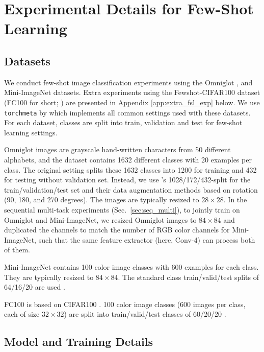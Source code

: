 \documentclass[nohyperref]{article}
\theoremstyle{plain}
\theoremstyle{definition}
\theoremstyle{remark}
\begin{document}
\section{Experimental Details for Few-Shot Learning}
\label{app:fs_exp}

\subsection{Datasets}
We conduct few-shot image classification experiments using the Omniglot \citep{lake2015human},
and Mini-ImageNet \citep{VinyalsBLKW16, RaviL17} datasets.
Extra experiments using the Fewshot-CIFAR100 dataset (FC100 for short; \citet{OreshkinLL18}) 
are presented in Appendix \ref{app:extra_fsl_exp} below.
We use \texttt{torchmeta} by \citet{deleu2019torchmeta} which implements all common settings used with these datasets. 
For each dataset, classes are split into train, validation and test for few-shot learning settings.

Omniglot images are grayscale hand-written characters from 50 different alphabets, and the dataset contains 1632 different classes with 20 examples per class.
The original setting \citep{lake2015human} splits these 1632 classes into 1200 for training and 
432 for testing without validation set.
Instead, we use \citet{VinyalsBLKW16}'s 1028/172/432-split for the train/validation/test set
and their data augmentation methods based on rotation (90, 180, and 270 degrees).
The images are typically resized to $28\times 28$.
In the sequential multi-task experiments
(Sec.~\ref{sec:seq_multi}), to jointly train on Omniglot and Mini-ImageNet, we resized Omniglot images to $84\times 84$ and duplicated the channels to match the number of RGB color channels for Mini-ImageNet, such that the same feature extractor (here, Conv-4) can process both of them.

Mini-ImageNet contains 100 color image classes with 600 examples for each class.
They are typically resized to $84\times 84$.
The standard class train/valid/test splits of 64/16/20 are used \citep{RaviL17}.

FC100 is based on CIFAR100 \citep{krizhevsky}.
100 color image classes (600 images per class, each of size $32\times 32$) are split into train/valid/test classes of 60/20/20 \citep{OreshkinLL18}.

\subsection{Model and Training Details}
\end{document}
